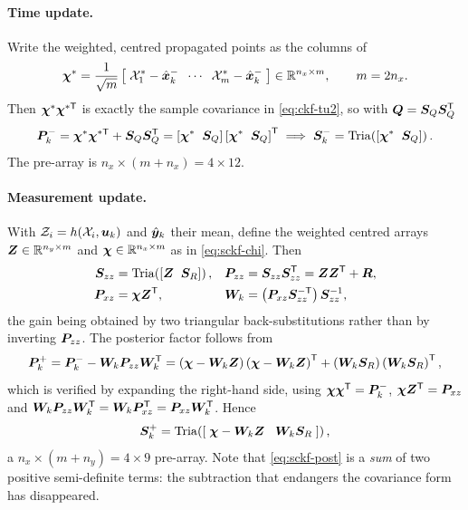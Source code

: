 \paragraph{Time update.} Write the weighted, centred propagated points as the columns of
\begin{equation}
\bm{\chi}^* = \frac{1}{\sqrt{m}}\left[\;\mathcal{X}^*_1-\hat{\bm{x}}^{-}_k \;\;\cdots\;\; \mathcal{X}^*_m-\hat{\bm{x}}^{-}_k\;\right]
 \in \mathbb{R}^{n_x\times m}, \qquad m = 2n_x .
\label{eq:sckf-chi}
\end{equation}
Then $\bm{\chi}^*\bm{\chi}^{*\mathsf{T}}$ is exactly the sample covariance in \eqref{eq:ckf-tu2}, so
with $\bm{Q} = \bm{S}_Q\bm{S}_Q^{\mathsf{T}}$
\begin{equation}
\bm{P}^{-}_k = \bm{\chi}^*\bm{\chi}^{*\mathsf{T}} + \bm{S}_Q\bm{S}_Q^{\mathsf{T}}
 = \left[\bm{\chi}^*\;\; \bm{S}_Q\right]\left[\bm{\chi}^*\;\; \bm{S}_Q\right]^{\mathsf{T}}
 \;\Longrightarrow\;
 \bm{S}^-_k = \operatorname{Tria}\!\left(\left[\bm{\chi}^*\;\;\bm{S}_Q\right]\right).
\label{eq:sckf-tu}
\end{equation}
The pre-array is $n_x\times(m+n_x) = 4\times 12$.

\paragraph{Measurement update.} With $\mathcal{Z}_i = h(\mathcal{X}_i,\bm{u}_k)$ and
$\hat{\bm{y}}_k$ their mean, define the weighted centred arrays
$\bm{Z}\in\mathbb{R}^{n_y\times m}$ and $\bm{\chi}\in\mathbb{R}^{n_x\times m}$ as in \eqref{eq:sckf-chi}.
Then
\begin{align}
\bm{S}_{zz} &= \operatorname{Tria}\!\left(\left[\bm{Z}\;\;\bm{S}_R\right]\right), &
\bm{P}_{zz} &= \bm{S}_{zz}\bm{S}_{zz}^{\mathsf{T}} = \bm{Z}\bm{Z}^{\mathsf{T}} + \bm{R}, \label{eq:sckf-szz}\\
\bm{P}_{xz} &= \bm{\chi}\bm{Z}^{\mathsf{T}}, &
\bm{W}_k &= \left(\bm{P}_{xz}\bm{S}_{zz}^{-\mathsf{T}}\right)\bm{S}_{zz}^{-1}, \label{eq:sckf-gain}
\end{align}
the gain being obtained by two triangular back-substitutions rather than by inverting
$\bm{P}_{zz}$. The posterior factor follows from
\begin{equation}
\bm{P}^{+}_k = \bm{P}^{-}_k - \bm{W}_k\bm{P}_{zz}\bm{W}_k^{\mathsf{T}}
 = \left(\bm{\chi}-\bm{W}_k\bm{Z}\right)\left(\bm{\chi}-\bm{W}_k\bm{Z}\right)^{\mathsf{T}} + \left(\bm{W}_k\bm{S}_R\right)\left(\bm{W}_k\bm{S}_R\right)^{\mathsf{T}},
\label{eq:sckf-post}
\end{equation}
which is verified by expanding the right-hand side, using $\bm{\chi}\bm{\chi}^{\mathsf{T}}=\bm{P}^{-}_k$,
$\bm{\chi}\bm{Z}^{\mathsf{T}} = \bm{P}_{xz}$ and $\bm{W}_k\bm{P}_{zz}\bm{W}_k^{\mathsf{T}} = \bm{W}_k\bm{P}_{xz}^{\mathsf{T}} = \bm{P}_{xz}\bm{W}_k^{\mathsf{T}}$.
Hence
\begin{equation}
\bm{S}^+_k = \operatorname{Tria}\!\left(\left[\;\bm{\chi}-\bm{W}_k\bm{Z} \;\;\; \bm{W}_k\bm{S}_R\;\right]\right),
\label{eq:sckf-sp}
\end{equation}
a $n_x\times(m+n_y) = 4\times 9$ pre-array. Note that \eqref{eq:sckf-post} is a \emph{sum} of
two positive semi-definite terms: the subtraction that endangers the covariance form has
disappeared.

